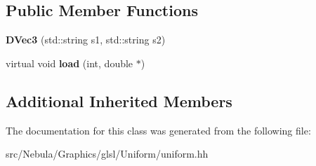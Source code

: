 \subsection*{Public Member Functions}
\begin{DoxyCompactItemize}
\item 
\hypertarget{classNeb_1_1glsl_1_1Uniform_1_1Vector_1_1DVec3_a0eafe586b49fbf3f40483014ee8ab93d}{{\bfseries D\-Vec3} (std\-::string s1, std\-::string s2)}\label{classNeb_1_1glsl_1_1Uniform_1_1Vector_1_1DVec3_a0eafe586b49fbf3f40483014ee8ab93d}

\item 
\hypertarget{classNeb_1_1glsl_1_1Uniform_1_1Vector_1_1DVec3_a259ae2290abc4445a5c661d2547597b5}{virtual void {\bfseries load} (int, double $\ast$)}\label{classNeb_1_1glsl_1_1Uniform_1_1Vector_1_1DVec3_a259ae2290abc4445a5c661d2547597b5}

\end{DoxyCompactItemize}
\subsection*{Additional Inherited Members}


The documentation for this class was generated from the following file\-:\begin{DoxyCompactItemize}
\item 
src/\-Nebula/\-Graphics/glsl/\-Uniform/uniform.\-hh\end{DoxyCompactItemize}
